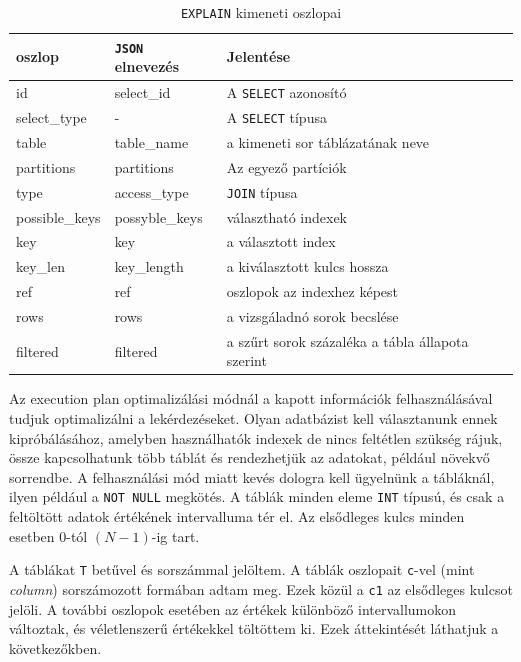 \begin{table}[h!]
\centering
\caption{\texttt{EXPLAIN} kimeneti oszlopai}
\label{tab:explain}
\medskip
\begin{tabular}{|p{3cm}|p{3cm}|p{8cm}|}
\hline
oszlop & \texttt{JSON} elnevezés & Jelentése \\
\hline
id & select\_id & A \texttt{SELECT} azonosító \\
\hline
select\_type & - & A \texttt{SELECT} típusa \\
\hline
table & table\_name & a kimeneti sor táblázatának neve  \\
\hline
partitions & partitions & Az egyező partíciók \\
\hline
type & access\_type & \texttt{JOIN} típusa  \\
\hline
possible\_keys & possyble\_keys & választható indexek \\
\hline
key & key & a választott index \\
\hline
key\_len & key\_length & a kiválasztott kulcs hossza \\
\hline
ref & ref & oszlopok az indexhez képest \\
\hline
rows & rows & a vizsgáladnó sorok becslése \\
\hline
filtered & filtered & a szűrt sorok százaléka a tábla állapota szerint \\
\hline
\end{tabular}
\end{table}


Az execution plan optimalizálási módnál a kapott információk felhasználásával tudjuk optimalizálni a lekérdezéseket.
Olyan adatbázist kell választanunk ennek kipróbálásához, amelyben használhatók indexek de nincs feltétlen szükség rájuk, össze kapcsolhatunk több táblát és rendezhetjük az adatokat, például növekvő sorrendbe. A felhasználási mód miatt kevés dologra kell ügyelnünk a tábláknál, ilyen például a \texttt{NOT NULL} megkötés. A táblák minden eleme \texttt{INT} típusú, és csak a feltöltött adatok értékének intervalluma tér el. Az elsődleges kulcs minden esetben 0-tól $(N-1)$-ig tart.

A táblákat \texttt{T} betűvel és sorszámmal jelöltem. A táblák oszlopait \texttt{c}-vel (mint \textit{column}) sorszámozott formában adtam meg. Ezek közül a \texttt{c1} az elsődleges kulcsot jelöli. A további oszlopok esetében az értékek különböző intervallumokon változtak, és véletlenszerű értékekkel töltöttem ki. Ezek áttekintését láthatjuk a következőkben.

